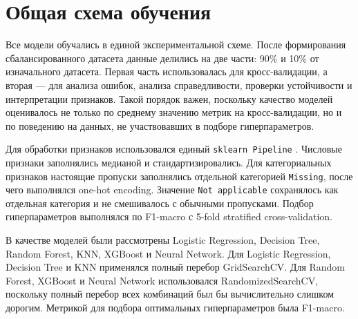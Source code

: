 \documentclass[14pt,a4paper]{extreport}
\begin{document}
\section{Общая схема обучения}
Все модели обучались в единой экспериментальной схеме. После формирования сбалансированного датасета данные делились на две части: 90\% и 10\% от изначального датасета. Первая часть использовалась для кросс-валидации, а вторая --- для анализа ошибок, анализа справедливости, проверки устойчивости и интерпретации признаков. Такой порядок важен, поскольку качество моделей оценивалось не только по среднему значению метрик на кросс-валидации, но и по поведению на данных, не участвовавших в подборе гиперпараметров.

Для обработки признаков использовался единый \texttt{sklearn Pipeline} \cite{sklearn}. Числовые признаки заполнялись медианой и стандартизировались. Для категориальных признаков настоящие пропуски заполнялись отдельной категорией \texttt{Missing}, после чего выполнялся one-hot encoding. Значение \texttt{Not applicable} сохранялось как отдельная категория и не смешивалось с обычными пропусками. Подбор гиперпараметров выполнялся по F1-macro с 5-fold stratified cross-validation.

В качестве моделей были рассмотрены Logistic Regression, Decision Tree, Random Forest, KNN, XGBoost и Neural Network. Для Logistic Regression, Decision Tree и KNN применялся полный перебор GridSearchCV. Для Random Forest, XGBoost и Neural Network использовался RandomizedSearchCV, поскольку полный перебор всех комбинаций был бы вычислительно слишком дорогим. Метрикой для подбора оптимальных гиперпараметров была F1-macro.
\end{document}
